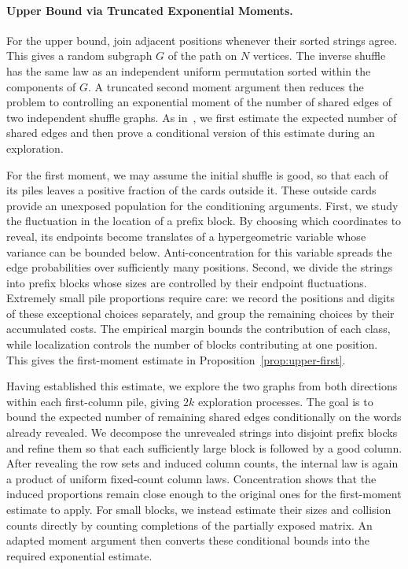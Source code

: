 \documentclass[11pt]{article}
\numberwithin{equation}{section}
\theoremstyle{definition}
\theoremstyle{remark}
\newcommand{\1}{\mathbf 1}
\begin{document}
\paragraph{Upper Bound via Truncated Exponential Moments.}
For the upper bound, join adjacent positions whenever their sorted
strings agree. This gives a random subgraph $G$ of the path on $N$
vertices. The inverse shuffle has the same law as an independent uniform
permutation sorted within the components of $G$. A truncated second
moment argument then reduces the problem to controlling an exponential
moment of the number of shared edges of two independent shuffle graphs.
As in~\cite{SSW}, we first estimate the expected number of shared edges
and then prove a conditional version of this estimate during an
exploration.

For the first moment, we may assume the initial shuffle is good, so
that each of its piles leaves a positive fraction of the cards outside
it. These outside cards provide an unexposed population for the
conditioning arguments. First, we study the fluctuation in the location
of a prefix block. By choosing which coordinates to reveal, its
endpoints become translates of a hypergeometric variable whose variance
can be bounded below. Anti-concentration for this variable spreads the
edge probabilities over sufficiently many positions. Second, we divide
the strings into prefix blocks whose sizes are controlled by their
endpoint fluctuations. Extremely small pile proportions require
care: we record the positions and digits of these exceptional choices
separately, and group the remaining choices by their accumulated costs.
The empirical margin bounds the contribution of each class, while
localization controls the number of blocks contributing at one position.
This gives the first-moment estimate in
Proposition~\ref{prop:upper-first}.

Having established this estimate, we explore the two graphs from both
directions within each first-column pile, giving $2k$ exploration
processes. The goal is to bound the expected number of remaining shared
edges conditionally on the words already revealed. We decompose the
unrevealed strings into disjoint prefix blocks and refine them so that
each sufficiently large block is followed by a good column. After
revealing the row sets and induced column counts, the internal law is
again a product of uniform fixed-count column laws. Concentration shows
that the induced proportions remain close enough to the original ones
for the first-moment estimate to apply. For small blocks, we instead
estimate their sizes and collision counts directly by counting
completions of the partially exposed matrix. An adapted moment argument
then converts these conditional bounds into the required exponential
estimate.
\end{document}
